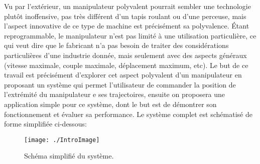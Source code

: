 

Vu par l’extérieur, un manipulateur polyvalent pourrait sembler une technologie
plutôt inoffensive, pas très différent d’un tapis roulant ou d’une perceuse, mais
l’aspect innovative de ce type de machine est précisément sa polyvalence. Étant
reprogrammable, le manipulateur n’est pas limité à une utilisation particulière, ce
qui veut dire que le fabricant n’a pas besoin de traiter des considérations
particulières d’une industrie donnée, mais seulement avec des aspects généraux
(vitesse maximale, couple maximale, déplacement maximum, etc).
Le but de ce travail est précisément d’explorer cet aspect polyvalent d’un
manipulateur en proposant un système qui permet l’utilisateur de commander la
position de l’extrémité du manipulateur e ses trajectoires, ensuite on proposera une
application simple pour ce système, dont le but est de démontrer son
fonctionnement et évaluer sa performance. Le système complet est schématisé de
forme simplifiée ci-dessous: 

\begin{figure}[H]
	\begin{center}	
		\texttt{[image: ./IntroImage]}
		\caption{Schéma simplifié du système.}
		\label{fig:Schema}
	\end{center}
\end{figure}